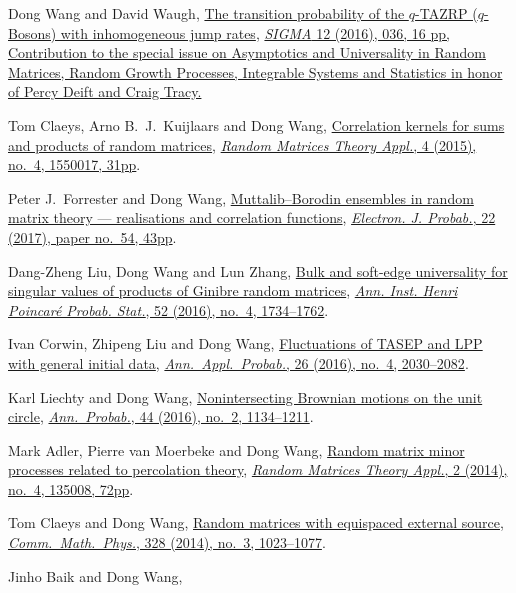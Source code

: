 \documentclass[12pt,a4paper]{article}
\begin{document}
\begin{etaremune}
  Dong Wang and David Waugh, \href{http://arxiv.org/abs/1512.01612}{The transition probability of the $q$-TAZRP ($q$-Bosons) with inhomogeneous jump rates}, \href{https://doi.org/10.3842/SIGMA.2016.037}{\textit{SIGMA} 12 (2016), 036, 16 pp, Contribution to the special issue on Asymptotics and Universality in Random Matrices, Random Growth Processes, Integrable Systems and Statistics in honor of Percy Deift and Craig Tracy.}
\item 
  Tom Claeys, Arno B.~J.~Kuijlaars and Dong Wang, \href{http://arxiv.org/abs/1505.00610}{Correlation kernels for sums and products of random matrices}, \href{https://doi.org/10.1142/S2010326315500173}{\textit{Random Matrices Theory Appl.}, 4 (2015), no.\ 4, 1550017, 31pp}.
\item
  Peter J.~Forrester and Dong Wang, \href{http://arxiv.org/abs/1502.07147}{Muttalib--Borodin ensembles in random matrix theory --- realisations and correlation functions}, \href{https://doi.org/10.1214/17-EJP62}{\textit{Electron. J. Probab.}, 22 (2017), paper no.\ 54, 43pp}.
\item
  Dang-Zheng Liu, Dong Wang and Lun Zhang, \href{http://arxiv.org/abs/1412.6777}{Bulk and soft-edge universality for singular values of products of Ginibre random matrices}, \href{https://doi.org/10.1214/15-AIHP696}{\textit{Ann. Inst. Henri Poincar\'e Probab. Stat.}, 52 (2016), no.\ 4, 1734--1762}.
\item
  Ivan Corwin, Zhipeng Liu and Dong Wang, \href{http://arxiv.org/abs/1412.5087}{Fluctuations of TASEP and LPP with general initial data}, \href{https://doi.org/10.1214/15-AAP1139}{\textit{Ann.\ Appl.\ Probab.}, 26 (2016), no.\ 4, 2030--2082}.
\item
  Karl Liechty and Dong Wang, \href{http://arxiv.org/abs/1312.7390}{Nonintersecting Brownian motions on the unit circle}, \href{https://doi.org/10.1214/14-AOP998}{\textit{Ann.\ Probab.}, 44 (2016), no.\ 2, 1134--1211}.
\item 
  Mark Adler, Pierre van Moerbeke and Dong Wang,
  \href{http://arxiv.org/abs/1301.7017}{Random matrix minor processes related to percolation theory}, \href{https://doi.org/10.1142/S2010326313500081}{\textit{Random Matrices Theory Appl.}, 2 (2014), no.\ 4, 135008, 72pp}.
\item 
  Tom Claeys and Dong Wang,
  \href{http://arxiv.org/abs/1212.3768}{Random matrices with equispaced external source}, \href{https://doi.org/10.1007/s00220-014-1988-y}{\textit{Comm.\ Math.\ Phys.}, 328 (2014), no.\ 3, 1023--1077}.
\item Jinho Baik and Dong Wang,

\end{etaremune}
\end{document}
